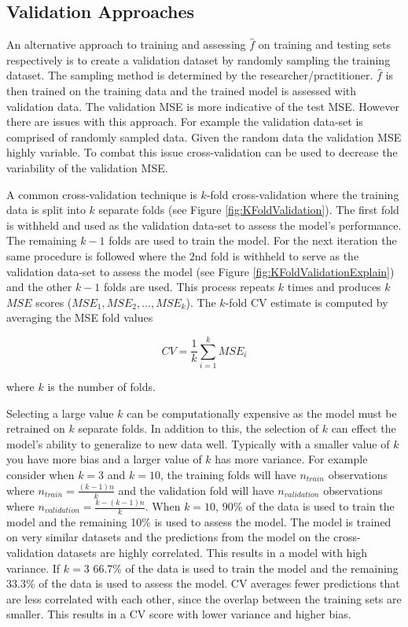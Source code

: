\subsection{Validation Approaches} \label{sec:validationApproach}

An alternative approach to training and assessing \(\hat{f}\) on training and testing sets respectively is to create a validation dataset by randomly sampling the training dataset. The sampling method is determined by the researcher/practitioner. \(\hat{f}\) is then trained on the training data and the trained model is assessed with validation data. The validation MSE is more indicative of the test MSE. However there are issues with this approach. For example the validation data-set is comprised of randomly sampled data. Given the random data the validation MSE highly variable. To combat this issue cross-validation can be used to  decrease the variability of the validation MSE.

A common cross-validation technique is \(k\)-fold cross-validation where the training data is split into \(k\) separate folds (see Figure \ref{fig:KFoldValidation}). The first fold is withheld and used as the validation data-set to assess the model's performance. The remaining \(k-1\) folds are used to train the model. For the next iteration the same procedure is followed where the 2nd fold is withheld to serve as the validation data-set to assess the model (see Figure \ref{fig:KFoldValidationExplain}) and the other \(k-1\) folds are used. This process repeats \(k\) times and  produces \(k\) \(MSE\) scores (\(MSE_1, MSE_2, ... , MSE_k\)). The \(k\)-fold CV estimate is  computed by averaging the MSE fold values

\begin{equation}
\label{eq:CV}
CV = \frac{1}{k} \sum_{i=1}^k MSE_i
\end{equation}

\noindent where \(k\) is the number of folds. 

Selecting a large value \(k\) can be computationally expensive as the model must be retrained on \(k\) separate folds. In addition to this, the selection of \(k\) can effect the model's ability to generalize to new data well. Typically with a smaller value of \(k\) you have more bias and a larger value of \(k\) has more variance. For example consider when \(k=3\) and \(k=10\), the training folds will have \(n_{train}\) observations where  \( n_{train}= \frac{(k-1)n}{k}\) and the validation fold will have \(n_{validation}\) observations where \( n_{validation}= \frac{k-(k-1)n}{k}\). When \(k=10\), 90\% of the data is used to train the model and the remaining 10\% is used to assess the model. The model is trained on very similar datasets and the predictions from the model on the cross-validation datasets are highly correlated. This results in a model with high variance. If \(k=3\) 66.7\% of the data is used to train the model and the remaining 33.3\% of the data is used to assess the model. CV averages fewer predictions that are less correlated with each other, since the overlap between the training sets are smaller.  This results in a CV score with lower variance and higher bias. 

